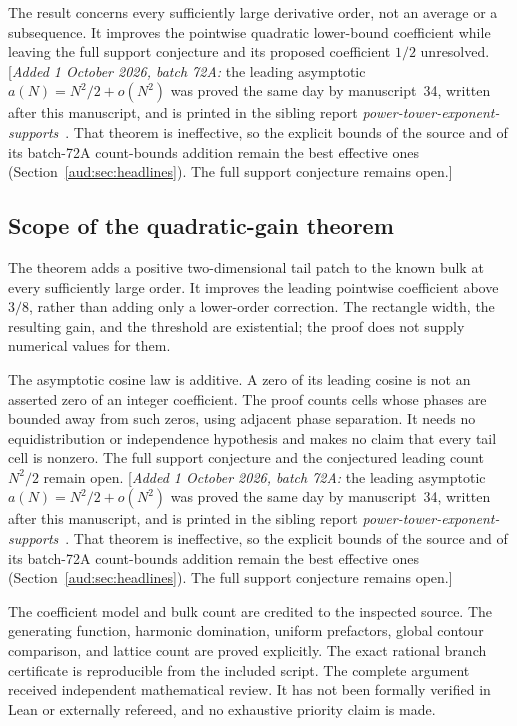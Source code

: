 \documentclass[11pt,a4paper]{article}
\numberwithin{equation}{section}
\newcommand{\addednote}[1]{{\small[\textit{Added 1 October 2026, batch 72A:} #1]}}
\begin{document}
The result concerns every sufficiently large derivative order, not an average or a subsequence. It improves the pointwise quadratic lower-bound coefficient while leaving the full support conjecture and its proposed coefficient $1/2$ unresolved. \addednote{the leading asymptotic $a(N)=N^2/2+o(N^2)$ was proved the same day by manuscript~34, written after this manuscript, and is printed in the sibling report \emph{power-tower-exponent-supports}~\cite{pte}. That theorem is ineffective, so the explicit bounds of the source and of its batch-72A count-bounds addition remain the best effective ones (Section~\ref{aud:sec:headlines}). The full support conjecture remains open.}
\subsection{Scope of the quadratic-gain theorem}
The theorem adds a positive two-dimensional tail patch to the known bulk at every sufficiently large order. It improves the leading pointwise coefficient above $3/8$, rather than adding only a lower-order correction. The rectangle width, the resulting gain, and the threshold are existential; the proof does not supply numerical values for them.

The asymptotic cosine law is additive. A zero of its leading cosine is not an asserted zero of an integer coefficient. The proof counts cells whose phases are bounded away from such zeros, using adjacent phase separation. It needs no equidistribution or independence hypothesis and makes no claim that every tail cell is nonzero. The full support conjecture and the conjectured leading count $N^2/2$ remain open. \addednote{the leading asymptotic $a(N)=N^2/2+o(N^2)$ was proved the same day by manuscript~34, written after this manuscript, and is printed in the sibling report \emph{power-tower-exponent-supports}~\cite{pte}. That theorem is ineffective, so the explicit bounds of the source and of its batch-72A count-bounds addition remain the best effective ones (Section~\ref{aud:sec:headlines}). The full support conjecture remains open.}

The coefficient model and bulk count are credited to the inspected source. The generating function, harmonic domination, uniform prefactors, global contour comparison, and lattice count are proved explicitly. The exact rational branch certificate is reproducible from the included script. The complete argument received independent mathematical review. It has not been formally verified in Lean or externally refereed, and no exhaustive priority claim is made.
\end{document}
